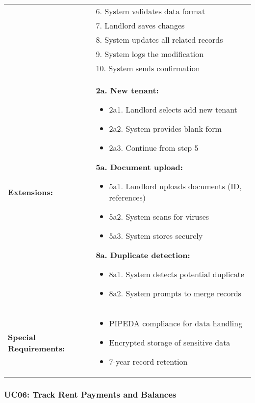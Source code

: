 \documentclass[12pt]{article}
\begin{document}
\begin{tabular}{|p{3cm}|p{11cm}|}
& 6. System validates data format \\
& 7. Landlord saves changes \\
& 8. System updates all related records \\
& 9. System logs the modification \\
& 10. System sends confirmation \\
\hline
\textbf{Extensions:} & 
\textbf{2a. New tenant:}
\begin{itemize}
    \item 2a1. Landlord selects add new tenant
    \item 2a2. System provides blank form
    \item 2a3. Continue from step 5
\end{itemize}
\textbf{5a. Document upload:}
\begin{itemize}
    \item 5a1. Landlord uploads documents (ID, references)
    \item 5a2. System scans for viruses
    \item 5a3. System stores securely
\end{itemize}
\textbf{8a. Duplicate detection:}
\begin{itemize}
    \item 8a1. System detects potential duplicate
    \item 8a2. System prompts to merge records
\end{itemize} \\
\hline
\textbf{Special Requirements:} & 
\begin{itemize}
    \item PIPEDA compliance for data handling
    \item Encrypted storage of sensitive data
    \item 7-year record retention
\end{itemize} \\
\hline
\end{tabular}


\subsubsection{UC06: Track Rent Payments and Balances}
\end{document}

